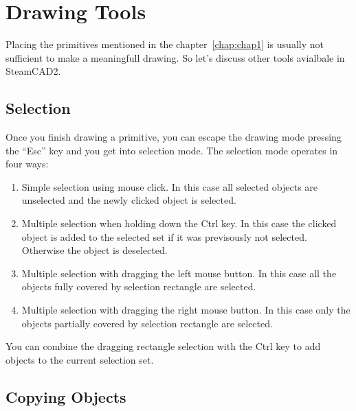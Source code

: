 \chapter{Drawing Tools}\label{chap:chap2}

Placing the primitives mentioned in the chapter~\ref{chap:chap1} is usually not
sufficient to make a meaningfull drawing. So let's discuss other tools avialbale
in SteamCAD2.

\section{Selection}

Once you finish drawing a primitive, you can escape the drawing mode pressing the ``Esc''
key and you get into selection mode. The selection mode operates in four ways:
\begin{enumerate}
\item Simple selection using mouse click. In this case all selected objects are unselected
and the newly clicked object is selected.
\item Multiple selection when holding down the Ctrl key. In this case the clicked
object is added to the selected set if it was previsously not selected. Otherwise
the object is deselected.
\item Multiple selection with dragging the left mouse button. In this case all the
objects fully covered by selection rectangle are selected.
\item Multiple selection with dragging the right mouse button. In this case only the
objects partially covered by selection rectangle are selected.
\end{enumerate}

You can combine the dragging rectangle selection with the Ctrl key to add objects
to the current selection set.

\section{Copying Objects}\label{sec:copyobj}


